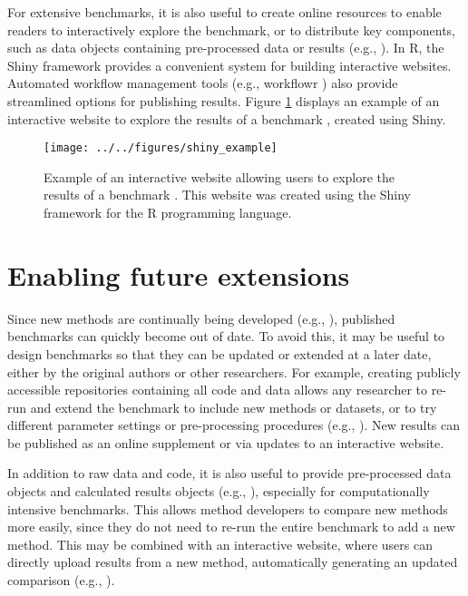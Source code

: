 \documentclass[12pt, a4paper]{article}
\begin{document}
For extensive benchmarks, it is also useful to create online resources to enable readers to interactively explore the benchmark, or to distribute key components, such as data objects containing pre-processed data or results (e.g., \citep{Soneson2018, Wiwie2015, Bokulich2016, Conchuir2015}). In R, the Shiny framework provides a convenient system for building interactive websites. Automated workflow management tools (e.g., workflowr \citep{Blischak2018}) also provide streamlined options for publishing results. Figure \ref{fig:shiny} displays an example of an interactive website to explore the results of a benchmark \citep{Saelens2018b}, created using Shiny.





\vskip 5mm

\begin{figure}[H]
\begin{center}
\texttt{[image: ../../figures/shiny\_example]}
\end{center}
\caption{Example of an interactive website allowing users to explore the results of a benchmark \citep{Saelens2018b}. This website was created using the Shiny framework for the R programming language.}
\label{fig:shiny}
\end{figure}




\section*{Enabling future extensions}

Since new methods are continually being developed (e.g., \citep{Zappia2018}), published benchmarks can quickly become out of date. To avoid this, it may be useful to design benchmarks so that they can be updated or extended at a later date, either by the original authors or other researchers. For example, creating publicly accessible repositories containing all code and data allows any researcher to re-run and extend the benchmark to include new methods or datasets, or to try different parameter settings or pre-processing procedures (e.g., \citep{Saelens2018a, Saelens2018b, Duo2018, Soneson2018, Weber2016}). New results can be published as an online supplement or via updates to an interactive website.

In addition to raw data and code, it is also useful to provide pre-processed data objects and calculated results objects (e.g., \citep{Duo2018}), especially for computationally intensive benchmarks. This allows method developers to compare new methods more easily, since they do not need to re-run the entire benchmark to add a new method. This may be combined with an interactive website, where users can directly upload results from a new method, automatically generating an updated comparison (e.g., \citep{Kanitz2015}).
\end{document}
